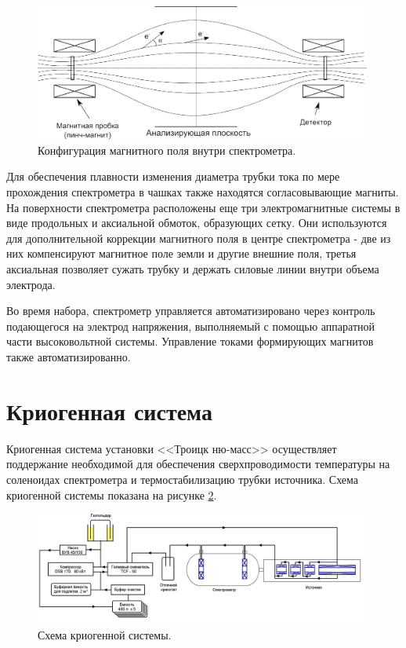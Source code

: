 \documentclass[a4paper,14pt]{extreport}
\begin{document}
\begin{figure}
  \centering
  \includegraphics[width = 0.99\textwidth]{img/nu_mass_setup/spectrometer-fields.png}
    \caption{Конфигурация магнитного поля внутри спектрометра.}
    \label{fig:numass-spectrometer-fields}
\end{figure}

Для обеспечения плавности изменения диаметра трубки тока по мере прохождения спектрометра в чашках также находятся согласовывающие магниты. На поверхности спектрометра расположены еще три электромагнитные системы в виде продольных и аксиальной обмоток, образующих сетку. Они используются для дополнительной коррекции магнитного поля в центре спектрометра - две из них компенсируют магнитное поле земли и другие внешние поля,  третья аксиальная позволяет сужать трубку и держать силовые линии внутри объема электрода. 

Во время набора, спектрометр управляется автоматизировано через контроль подающегося на электрод напряжения, выполняемый с помощью аппаратной части высоковольтной системы. Управление токами формирующих магнитов также автоматизированно.

\section{Криогенная система}

Криогенная система установки <<Троицк ню-масс>> осуществляет поддержание необходимой для обеспечения сверхпроводимости температуры на соленоидах спектрометра и термостабилизацию трубки источника. Схема криогенной системы показана на рисунке \ref{fig:numass-cryogenic}.

\begin{figure}
  \centering
  \includegraphics[width = 0.99\textwidth]{img/nu_mass_setup/cryogenic.png}
    \caption{Схема криогенной системы.}
    \label{fig:numass-cryogenic}
\end{figure}
\end{document}
